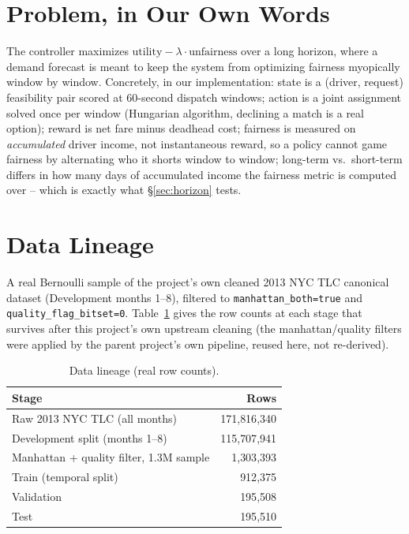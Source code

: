 \documentclass[10pt,twocolumn,a4paper]{article}
\begin{document}
\section{Problem, in Our Own Words}
The controller maximizes $\text{utility} - \lambda\cdot\text{unfairness}$ over
a long horizon, where a demand forecast is meant to keep the system from
optimizing fairness myopically window by window. Concretely, in our
implementation: state is a (driver, request) feasibility pair scored at
60-second dispatch windows; action is a joint assignment solved once per
window (Hungarian algorithm, declining a match is a real option); reward is
net fare minus deadhead cost; fairness is measured on \emph{accumulated}
driver income, not instantaneous reward, so a policy cannot game fairness by
alternating who it shorts window to window; long-term vs.\ short-term
differs in how many days of accumulated income the fairness metric is
computed over -- which is exactly what \S\ref{sec:horizon} tests.

\section{Data Lineage}
A real Bernoulli sample of the project's own cleaned 2013 NYC TLC canonical
dataset (Development months 1--8), filtered to \texttt{manhattan\_both=true}
and \texttt{quality\_flag\_bitset=0}. Table~\ref{tab:lineage} gives the row
counts at each stage that survives after this project's own upstream
cleaning (the manhattan/quality filters were applied by the parent
project's own pipeline, reused here, not re-derived).

\begin{table}[h!]
\centering
\caption{Data lineage (real row counts).}
\label{tab:lineage}
\footnotesize
\begin{tabular}{@{}lr@{}}
\toprule
Stage & Rows \\
\midrule
Raw 2013 NYC TLC (all months) & 171{,}816{,}340 \\
Development split (months 1--8) & 115{,}707{,}941 \\
Manhattan + quality filter, 1.3M sample & 1{,}303{,}393 \\
Train (temporal split) & 912{,}375 \\
Validation & 195{,}508 \\
Test & 195{,}510 \\
\bottomrule
\end{tabular}
\end{table}
\end{document}
